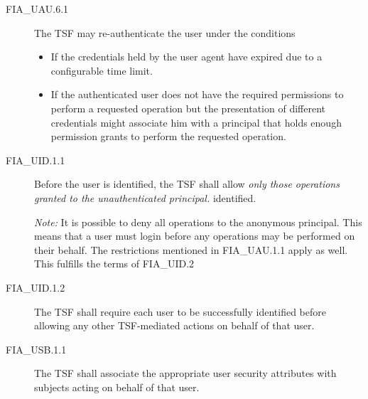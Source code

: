 \documentclass[12pt,english]{scrbook}
\begin{document}
\begin{description}

\item[FIA{\_}UAU.6.1 ]


The TSF may re-authenticate the user under the conditions
\begin{itemize}
\item {} 
If the credentials held by the user agent have expired due to
a configurable time limit.

\item {} 
If the authenticated user does not have the required permissions to
perform a requested operation but the presentation of different
credentials might associate him with a principal that holds enough
permission grants to perform the requested operation.

\end{itemize}



\end{description}


\begin{description}

\item[FIA{\_}UID.1.1 ]

Before the user is identified, the TSF shall allow \emph{only those operations
granted to the unauthenticated principal.}
identified.

\emph{Note:} It is possible to deny all operations to the anonymous
principal. This means that a user must login before any operations may
be performed on their behalf. The restrictions mentioned in FIA\_UAU.1.1 apply
as well.  This fulfills the terms of FIA\_UID.2


\item[FIA{\_}UID.1.2 ]


The TSF shall require each user to be successfully
identified before allowing any other TSF-mediated actions on behalf
of that user.



\end{description}



\begin{description}

\item[FIA{\_}USB.1.1]


The TSF shall associate the appropriate user security
attributes with subjects acting on behalf of that user.



\end{description}
\end{document}
